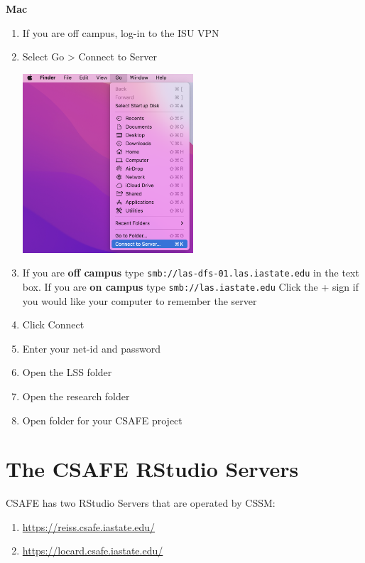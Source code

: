 \documentclass[
]{book}
\providecommand{\tightlist}{%
  \setlength{\itemsep}{0pt}\setlength{\parskip}{0pt}}
\begin{document}
\textbf{Mac}

\begin{enumerate}
\def\labelenumi{\arabic{enumi}.}
\tightlist
\item
  If you are off campus, log-in to the ISU VPN
\item
  Select Go \textgreater{} Connect to Server

  \includegraphics[width=0.5\textwidth,height=0.5\textheight]{images/connect_to_server.png}
\item
  If you are \textbf{off campus} type \texttt{smb://las-dfs-01.las.iastate.edu} in the text box. If you are \textbf{on campus} type \texttt{smb://las.iastate.edu} Click the + sign if you would like your computer to remember the server
\item
  Click Connect
\item
  Enter your net-id and password
\item
  Open the LSS folder
\item
  Open the research folder
\item
  Open folder for your CSAFE project
\end{enumerate}

\hypertarget{the-csafe-rstudio-servers}{%
\chapter{The CSAFE RStudio Servers}\label{the-csafe-rstudio-servers}}

CSAFE has two RStudio Servers that are operated by CSSM:

\begin{enumerate}
\def\labelenumi{\arabic{enumi}.}
\tightlist
\item
  \url{https://reiss.csafe.iastate.edu/}
\item
  \url{https://locard.csafe.iastate.edu/}
\end{enumerate}
\end{document}
